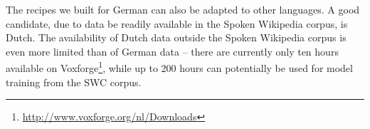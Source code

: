 \documentclass[a4paper]{article}
\begin{document}
The recipes we built for German can also be adapted to other languages. A good candidate, due to data be readily available in the Spoken Wikipedia corpus, is Dutch. The availability of Dutch data outside the Spoken Wikipedia corpus is even more limited than of German data -- there are currently
only ten hours available on Voxforge\footnote{\url{http://www.voxforge.org/nl/Downloads}}, while up to 200 hours can potentially be used for model training from the SWC corpus.

\small


\end{document}
